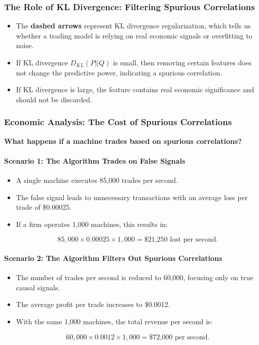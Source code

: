 \subsubsection*{The Role of KL Divergence: Filtering Spurious Correlations}

\begin{itemize}
    \item The \textbf{dashed arrows} represent KL divergence regularization, which tells us whether a trading model is relying on real economic signals or overfitting to noise.
    \item If KL divergence \( D_{KL}(P || Q) \) is small, then removing certain features does not change the predictive power, indicating a spurious correlation.
    \item If KL divergence is large, the feature contains real economic significance and should not be discarded.
\end{itemize}

\subsubsection*{Economic Analysis: The Cost of Spurious Correlations}

\textbf{What happens if a machine trades based on spurious correlations?}

\paragraph{Scenario 1: The Algorithm Trades on False Signals}
\begin{itemize}
    \item A single machine executes 85,000 trades per second.
    \item The false signal leads to unnecessary transactions with an average loss per trade of \$0.00025.
    \item If a firm operates 1,000 machines, this results in:

    \[
    85,000 \times 0.00025 \times 1,000 = \text{\$21,250 lost per second}.
    \]

\end{itemize}

\paragraph{Scenario 2: The Algorithm Filters Out Spurious Correlations}
\begin{itemize}
    \item The number of trades per second is reduced to 60,000, focusing only on true causal signals.
    \item The average profit per trade increases to \$0.0012.
    \item With the same 1,000 machines, the total revenue per second is:

    \[
    60,000 \times 0.0012 \times 1,000 = \text{\$72,000 per second}.
    \]

\end{itemize}

